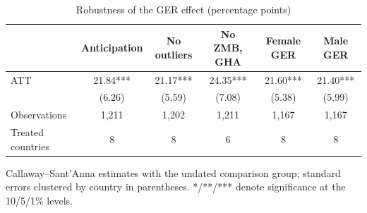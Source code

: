 \begin{table}[t]
\centering
\begin{threeparttable}
\caption{Robustness of the GER effect (percentage points)}
\label{tab:robust_level}
\begin{tabular}{lccccc}
\toprule
 & Anticipation & No outliers & No ZMB, GHA & Female GER & Male GER \\
\midrule
ATT & 21.84*** & 21.17*** & 24.35*** & 21.60*** & 21.40*** \\
 & (6.26) & (5.59) & (7.08) & (5.38) & (5.99) \\
Observations & 1,211 & 1,202 & 1,211 & 1,167 & 1,167 \\
Treated countries & 8 & 8 & 6 & 8 & 8 \\
\bottomrule
\end{tabular}
\begin{tablenotes}[flushleft]
\footnotesize
\item Callaway--Sant'Anna estimates with the undated comparison group; standard errors clustered by country in parentheses. */**/*** denote significance at the 10/5/1\% levels.
\end{tablenotes}
\end{threeparttable}
\end{table}
